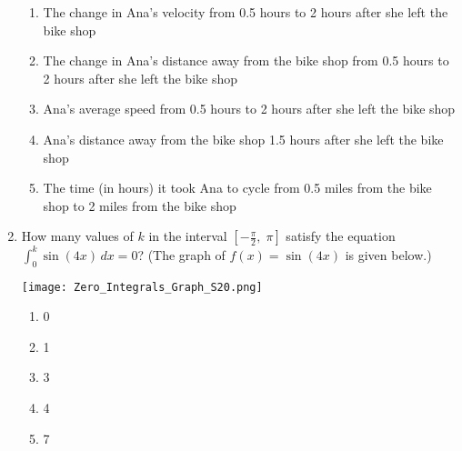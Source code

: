 \documentclass[12pt]{report}
\begin{document}
\begin{enumerate}
\begin{enumerate}
\item The change in Ana's velocity from 0.5 hours to 2 hours after she left the bike shop

\item The change in Ana's distance away from the bike shop from 0.5 hours to 2 hours after she left the bike shop

\item Ana's average speed from 0.5 hours to 2 hours after she left the bike shop

\item Ana's distance away from the bike shop 1.5 hours after she left the bike shop

\item The time (in hours) it took Ana to cycle from 0.5 miles from the bike shop to 2 miles from the bike shop

\end{enumerate}

\pagebreak

\item How many values of $k$ in the interval $\left[-\frac{\pi}{2},\;\pi\right]$ satisfy the equation $\int_0^k \sin(4x)\,dx = 0$? (The graph of $f(x) = \sin(4x)$ is given below.)

\begin{center}
\texttt{[image: Zero\_Integrals\_Graph\_S20.png]}
\end{center}

\begin{enumerate}

\item 0

\item 1

\item 3

\item 4

\item 7

\end{enumerate}





\end{enumerate}
\end{document}
